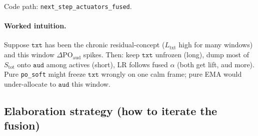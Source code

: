 \documentclass[11pt]{article}
\newcommand{\PO}{\mathrm{PO}}
\begin{document}
Code path: \texttt{next\_step\_actuators\_fused}.

\paragraph{Worked intuition.}
Suppose $\texttt{txt}$ has been the chronic residual-concept
($L_{\mathrm{txt}}$ high for many windows) and this window
$\Delta\PO_{\mathrm{aud}}$ spikes.
Then: keep $\texttt{txt}$ unfrozen (long), dump most of $S_{\mathrm{tot}}$
onto $\texttt{aud}$ among actives (short), LR follows fused $\alpha$
(both get lift, aud more).
Pure \texttt{po\_soft} might freeze $\texttt{txt}$ wrongly on one calm
frame; pure EMA would under-allocate to $\texttt{aud}$ this window.

\subsection{Elaboration strategy (how to iterate the fusion)}
\label{sec:fuse-strategy}
\end{document}
